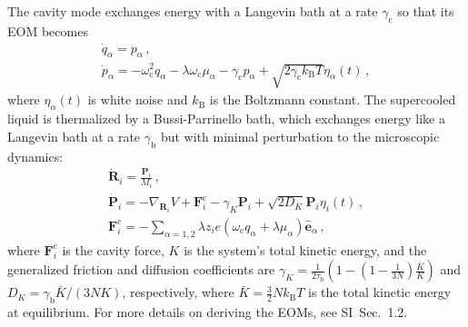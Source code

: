 \documentclass[aps, prl,
 reprint,
 superscriptaddress,
 citeautoscript,  %
 amsmath,amssymb,
 tightenlines
]{revtex4-2}
\begin{document}
The cavity mode exchanges energy with a Langevin bath at a rate $\gamma_\mathrm{c}$ so that its EOM becomes
\begin{gather}
\dot{q}_{\alpha} = p_\alpha \label{eq:langevin_cavity_1} \,, \\ 
\dot{p}_\alpha = -\omega_\mathrm{c}^2 q_\alpha - \lambda \omega_\mathrm{c} \mu_\alpha -\gamma_\mathrm{c} p_\alpha +\sqrt{2 \gamma_\mathrm{c} k_\mathrm{B} T } \eta_\alpha(t)  \,, \label{eq:langevin_cavity_2}
\end{gather}
where $\eta_\alpha(t)$ is white noise and $k_\mathrm{B}$ is the Boltzmann constant.
The supercooled liquid is thermalized by a Bussi-Parrinello bath,\cite{bussi2007canonical,bussi2008stochastic} which exchanges energy like a Langevin bath at a rate $\gamma_\mathrm{b}$ but with minimal perturbation to the microscopic dynamics: 
\begin{gather}
\dot{\bm{R}}_i = \frac{\bm{P}_i}{M_i} \,, \label{eq:bussi_mol_1} \\
\dot{\bm{P}}_i = -\nabla_{\bm{R}_i} V +\bm F_i^\mathrm{c}  -\gamma_K \bm P_i + \sqrt{2 D_K} \bm P_i \eta_i (t) \,, \label{eq:bussi_mol_2}
\\
\bm F_i^\mathrm{c} = - \sum_{\alpha=1,2} \lambda z_i e \left(\omega_\mathrm{c} q_\alpha + \lambda \mu_\alpha \right)\hat{\bm e}_\alpha \,,
\end{gather}
where $\bm F_i^\mathrm{c} $ is the cavity force, $K$ is the system's total kinetic energy, and the generalized friction and diffusion coefficients are $\gamma_K = \frac{1}{2\tau_\mathrm{b}} \left(1-\left(1-\frac{1}{3 N}\right) \frac{\bar{K}}{K}\right)$ and $ D_K = \gamma_\mathrm{b} \bar{K} / (3 N  K)$, respectively, where $\bar{K} = \frac{3}{2}Nk_\mathrm{B} T$ is the total kinetic energy at equilibrium. For more details on deriving the EOMs, see SI~Sec.~1.2. %
\end{document}

